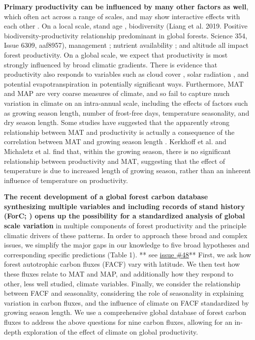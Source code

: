\documentclass[]{article}
\begin{document}
\textbf{Primary productivity can be influenced by many other factors as
well}, which often act across a range of scales, and may show
interactive effects with each other
\citep{cleveland_relationships_2011}. On a local scale, stand age
\citep{litton_carbon_2007, gillman_latitude_2015}, biodiversity (Liang
et al. 2019. Positive biodiversity-productivity relationship predominant
in global forests. Science 354, Issue 6309, aaf8957), management
\citep{simova_enigma_2017}; nutrient availability
\citep{aragao_above-_2009}; and altitude
\citep{girardin_net_2010, malhi_variation_2017} all impact forest
productivity. On a global scale, we expect that productivity is most
strongly influenced by broad climatic gradients. There is evidence that
productivity also responds to variables such as cloud cover
\citep{taylor_temperature_2017}, solar radiation
\citep{fyllas_solar_2017}, and potential evapotranspiration
\citep{kerkhoff_plant_2005} in potentially significant ways.
Furthermore, MAT and MAP are very coarse measures of climate, and so
fail to capture much variation in climate on an intra-annual scale,
including the effects of factors such as growing season length, number
of frost-free days, temperature seasonality, and dry season length. Some
studies have suggested that the apparently strong relationship between
MAT and productivity is actually a consequence of the correlation
between MAT and growing season length
\citep{kerkhoff_plant_2005, malhi_productivity_2012, michaletz_convergence_2014, michaletz_drivers_2018}.
Kerkhoff et al. \citeyearpar{kerkhoff_plant_2005} and Michaletz et al.
\citeyearpar{michaletz_convergence_2014} find that, within the growing
season, there is no significant relationship between productivity and
MAT, suggesting that the effect of temperature is due to increased
length of growing season, rather than an inherent influence of
temperature on productivity.

\textbf{The recent development of a global forest carbon database
synthesizing multiple variables and including records of stand history
(ForC;
\citep{anderson-teixeira_carbon_2016, anderson-teixeira_forc:_2018})
opens up the possibility for a standardized analysis of global scale
variation} in multiple components of forest productivity and the
principle climatic drivers of these patterns. In order to approach these
broad and complex issues, we simplify the major gaps in our knowledge to
five broad hypotheses and corresponding specific predictions (Table 1).
** see
\href{https://github.com/forc-db/Global_Productivity/issues/48}{issue
\#48}** First, we ask how forest autotrophic carbon fluxes (FACF) vary
with latitude. We then test how these fluxes relate to MAT and MAP, and
additionally how they respond to other, less well studied, climate
variables. Finally, we consider the relationship between FACF and
seasonality, considering the role of seasonality in explaining variation
in carbon fluxes, and the influence of climate on FACF standardized by
growing season length. We use a comprehensive global database of forest
carbon fluxes to address the above questions for nine carbon fluxes,
allowing for an in-depth exploration of the effect of climate on global
productivity.
\end{document}
